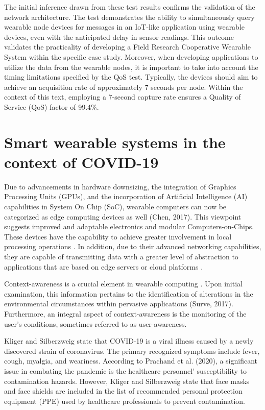 The initial inference drawn from these test results confirms the validation of the network architecture. The test demonstrates the ability to simultaneously query wearable node devices for messages in an IoT-like application using wearable devices, even with the anticipated delay in sensor readings. This outcome validates the practicality of developing a Field Research Cooperative Wearable System within the specific case study. Moreover, when developing applications to utilize the data from the wearable nodes, it is important to take into account the timing limitations specified by the QoS test. Typically, the devices should aim to achieve an acquisition rate of approximately 7 seconds per node. Within the context of this text, employing a 7-second capture rate ensures a Quality of Service (QoS) factor of 99.4\%.

\section{Smart wearable systems in the context of COVID-19}

Due to advancements in hardware downsizing, the integration of Graphics Processing Units (GPUs), and the incorporation of Artificial Intelligence (AI) capabilities in System On Chip (SoC), wearable computers can now be categorized as edge computing devices as well (Chen, 2017). This viewpoint suggests improved and adaptable electronics and modular Computers-on-Chips. These devices have the capability to achieve greater involvement in local processing operations \cite{kim2017miniaturized}. In addition, due to their advanced networking capabilities, they are capable of transmitting data with a greater level of abstraction to applications that are based on edge servers or cloud platforms \cite{ren2017serving}. 

Context-awareness is a crucial element in wearable computing \cite{grubert2016towards}. Upon initial examination, this information pertains to the identification of alterations in the environmental circumstances within pervasive applications (Surve, 2017). Furthermore, an integral aspect of context-awareness is the monitoring of the user's conditions, sometimes referred to as user-awareness.

Kliger and Silberzweig \cite{kliger2020mitigating} state that COVID-19 is a viral illness caused by a newly discovered strain of coronavirus. The primary recognized symptoms include fever, cough, myalgia, and weariness. According to Prachand et al. (2020), a significant issue in combating the pandemic is the healthcare personnel' susceptibility to contamination hazards. However, Kliger and Silberzweig \cite{kliger2020mitigating} state that face masks and face shields are included in the list of recommended personal protection equipment (PPE) used by healthcare professionals to prevent contamination.

